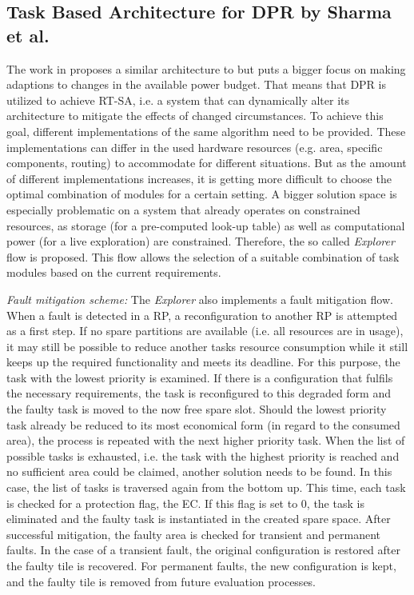 \subsection{Task Based Architecture for \gls{DPR} by Sharma et al.}\label{sec:TaskBasedArchitectureSharma}
The work in \cite{sharma_run-time_2018} proposes a similar architecture to \cite{wang_dynamic_2018} but puts a bigger focus on making adaptions to changes in the available power budget.
That means that \gls{DPR} is utilized to achieve \gls{RT-SA}, i.e. a system that can dynamically alter its architecture to mitigate the effects of changed circumstances.
To achieve this goal, different implementations of the same algorithm need to be provided.
These implementations can differ in the used hardware resources (e.g. area, specific components, routing) to accommodate for different situations.
But as the amount of different implementations increases, it is getting more difficult to choose the optimal combination of modules for a certain setting.
A bigger solution space is especially problematic on a system that already operates on constrained resources, as storage (for a pre-computed look-up table) as well as computational power (for a live exploration) are constrained. 
Therefore, the so called \textit{Explorer} flow is proposed.
This flow allows the selection of a suitable combination of task modules based on the current requirements.

\emph{Fault mitigation scheme:}
The \textit{Explorer} also implements a fault mitigation flow.
When a fault is detected in a \gls{RP}, a reconfiguration to another \gls{RP} is attempted as a first step.
If no spare partitions are available (i.e. all resources are in usage), it may still be possible to reduce another tasks resource consumption while it still keeps up the required functionality and meets its deadline.
For this purpose, the task with the lowest priority is examined.
If there is a configuration that fulfils the necessary requirements, the task is reconfigured to this degraded form and the faulty task is moved to the now free spare slot.
Should the lowest priority task already be reduced to its most economical form (in regard to the consumed area), the process is repeated with the next higher priority task. 
When the list of possible tasks is exhausted, i.e. the task with the highest priority is reached and no sufficient area could be claimed, another solution needs to be found. 
In this case, the list of tasks is traversed again from the bottom up. 
This time, each task is checked for a protection flag, the \gls{EC}. 
If this flag is set to 0, the task is eliminated and the faulty task is instantiated in the created spare space.
After successful mitigation, the faulty area is checked for transient and permanent faults. 
In the case of a transient fault, the original configuration is restored after the faulty tile is recovered. 
For permanent faults, the new configuration is kept, and the faulty tile is removed from future evaluation processes. 
